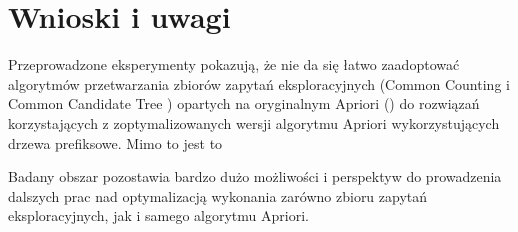 \chapter{Wnioski i uwagi}

Przeprowadzone eksperymenty pokazują, że nie da się łatwo zaadoptować algorytmów przetwarzania zbiorów zapytań eksploracyjnych (Common Counting \cite{WojciechowskiCC} i Common Candidate Tree \cite{WojciechowskiCCT}) opartych na oryginalnym Apriori (\cite{Agrawal}) do rozwiązań korzystających z zoptymalizowanych wersji algorytmu Apriori wykorzystujących drzewa prefiksowe. Mimo to jest to 

Badany obszar pozostawia bardzo dużo możliwości i perspektyw do prowadzenia dalszych prac nad optymalizacją wykonania zarówno zbioru zapytań eksploracyjnych, jak i samego algorytmu Apriori. 